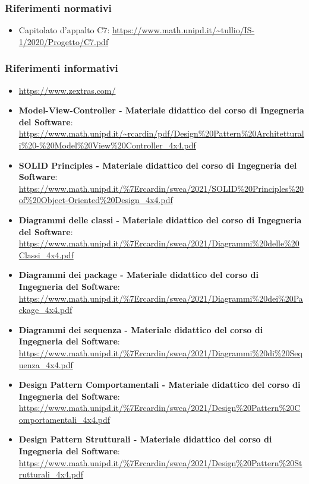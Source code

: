 \subsubsection{Riferimenti normativi}
\begin{itemize}
\item Capitolato d'appalto C7: \newline{} \url{https://www.math.unipd.it/~tullio/IS-1/2020/Progetto/C7.pdf}
\end{itemize}

\subsubsection{Riferimenti informativi}

\begin{itemize}
    \item \url{https://www.zextras.com/}
    \item \textbf{Model-View-Controller - Materiale didattico del corso di Ingegneria del Software}: \newline{}
    \url{https://www.math.unipd.it/~rcardin/pdf/Design\%20Pattern\%20Architetturali\%20-\%20Model\%20View\%20Controller_4x4.pdf}
    \item \textbf{SOLID Principles - Materiale didattico del corso di Ingegneria del Software}: \newline{}
    \url{https://www.math.unipd.it/\%7Ercardin/swea/2021/SOLID\%20Principles\%20of\%20Object-Oriented\%20Design_4x4.pdf}
    \item \textbf{Diagrammi delle classi - Materiale didattico del corso di Ingegneria del Software}: \newline{}
    \url{https://www.math.unipd.it/\%7Ercardin/swea/2021/Diagrammi\%20delle\%20Classi_4x4.pdf}
    \item \textbf{Diagrammi dei package - Materiale didattico del corso di Ingegneria del Software}: \newline{}
    \url{https://www.math.unipd.it/\%7Ercardin/swea/2021/Diagrammi\%20dei\%20Package_4x4.pdf}
    \item \textbf{Diagrammi dei sequenza - Materiale didattico del corso di Ingegneria del Software}: \newline{}
    \url{https://www.math.unipd.it/\%7Ercardin/swea/2021/Diagrammi\%20di\%20Sequenza_4x4.pdf}
    \item \textbf{Design Pattern Comportamentali - Materiale didattico del corso di Ingegneria del Software}: \newline{} \url{https://www.math.unipd.it/\%7Ercardin/swea/2021/Design\%20Pattern\%20Comportamentali_4x4.pdf}
    \item \textbf{Design Pattern Strutturali - Materiale didattico del corso di Ingegneria del Software}: \newline{}
    \url{https://www.math.unipd.it/\%7Ercardin/swea/2021/Design\%20Pattern\%20Strutturali_4x4.pdf}
\end{itemize}

